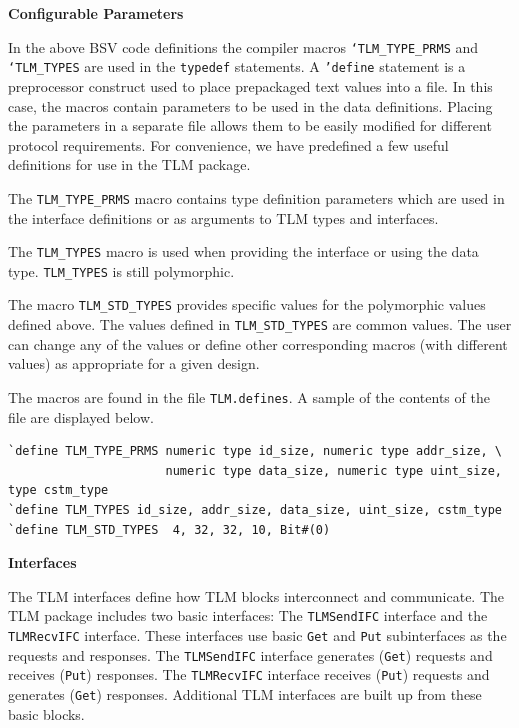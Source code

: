 \documentclass[twoside,letterpaper]{article}
\newcommand{\te}[1]{\texttt{#1}}
\begin{document}
{\bf Configurable Parameters}
\label{TLM-defines}

 
In the above BSV code definitions the compiler macros
 \te{`TLM\_TYPE\_PRMS} and \te{`TLM\_TYPES} are used in the
\te{typedef} statements.  A \te{'define} statement is a preprocessor
 construct used to place prepackaged text values into a file.  In this case, the  macros
 contain   parameters to be used in the
 data definitions.  Placing the  parameters in a separate file allows them
 to be easily modified for different protocol requirements.  For
 convenience, we have predefined a few useful definitions for use in
 the TLM package.

The \te{TLM\_TYPE\_PRMS} macro contains type definition parameters
which are used in the interface definitions or as arguments to TLM
types and interfaces.

The \te{TLM\_TYPES} macro is used when providing the interface or
using the data type. \te{TLM\_TYPES} is still polymorphic.

The macro \te{TLM\_STD\_TYPES} provides specific values for the
polymorphic values defined above. The values defined in
\te{TLM\_STD\_TYPES} are common values. The user can change any of the
values or define other corresponding macros (with different values) as
appropriate for a given design.

The macros  are found in the file \te{TLM.defines}.  A
sample of the  contents of the file are displayed below.

\begin{verbatim}
`define TLM_TYPE_PRMS numeric type id_size, numeric type addr_size, \
                      numeric type data_size, numeric type uint_size, type cstm_type
`define TLM_TYPES id_size, addr_size, data_size, uint_size, cstm_type
`define TLM_STD_TYPES  4, 32, 32, 10, Bit#(0)
\end{verbatim}


{\bf Interfaces}
 
\label{TLM-interfaces}
The TLM interfaces define how TLM blocks interconnect and communicate.
The TLM package includes two basic interfaces: The \te{TLMSendIFC}
interface and the \te{TLMRecvIFC} interface.  These interfaces use 
basic \te{Get} and \te{Put} subinterfaces as the requests and responses. The \te{TLMSendIFC} interface
generates (\te{Get}) requests  and receives (\te{Put}) responses. 
The \te{TLMRecvIFC} interface receives (\te{Put}) requests and
generates (\te{Get}) responses. Additional TLM interfaces are built up from
these basic blocks.
\end{document}
